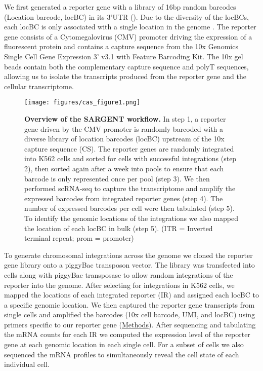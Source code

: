We first generated a reporter gene with a library of 16bp random barcodes (Location barcode, locBC) in its 3’UTR (). Due to the diversity of the locBCs, each locBC is only associated with a single location in the genome \cite{akhtarw_vansteenselb:ChromatinPosition2013}. The reporter gene consists of a Cytomegalovirus (CMV) promoter driving the expression of a fluorescent protein and contains a capture sequence from the 10x Genomics Single Cell Gene Expression 3' v3.1 with Feature Barcoding Kit. The 10x gel beads contain both the complementary capture sequence and polyT sequences, allowing us to isolate the transcripts produced from the reporter gene and the cellular transcriptome. 

\begin{figure}[t]  
    \centering
    \texttt{[image: figures/cas\_figure1.png]}
    \caption[Overview of the SARGENT workflow.]{%
        \textbf{Overview of the SARGENT workflow.}
         In step 1, a reporter gene driven by the CMV promoter is randomly barcoded with a diverse library of location barcodes (locBC) upstream of the 10x capture sequence (CS). The reporter genes are randomly integrated into K562 cells and sorted for cells with successful integrations (step 2), then sorted again after a week into pools to ensure that each barcode is only represented once per pool (step 3). We then performed scRNA-seq to capture the transcriptome and amplify the expressed barcodes from integrated reporter genes (step 4). The number of expressed barcodes per cell were then tabulated (step 5). To identify the genomic locations of the integrations we also mapped the location of each locBC in bulk (step 5). (ITR = Inverted terminal repeat; prom = promoter)
    }
    \label{fig:cas_figure1}
\end{figure}

To generate chromosomal integrations across the genome we cloned the reporter gene library onto a piggyBac transposon vector. The library was transfected into cells along with piggyBac transposase to allow random integrations of the reporter into the genome. After selecting for integrations in K562 cells, we mapped the locations of each integrated reporter (IR) and assigned each locBC to a specific genomic location. We then captured the reporter gene transcripts from single cells and amplified the barcodes (10x cell barcode, UMI, and locBC) using primers specific to our reporter gene (\hyperref[section:cas_methods]{Methods}). After sequencing and tabulating the mRNA counts for each IR we computed the expression level of the reporter gene at each genomic location in each single cell. For a subset of cells we also sequenced the mRNA profiles to simultaneously reveal the cell state of each individual cell.

